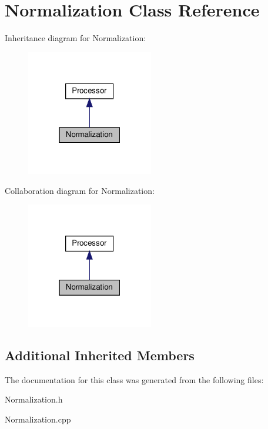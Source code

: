 \hypertarget{classNormalization}{}\section{Normalization Class Reference}
\label{classNormalization}


Inheritance diagram for Normalization\+:
\nopagebreak
\begin{figure}[H]
\begin{center}
\leavevmode
\includegraphics[width=157pt]{d2/d5e/classNormalization__inherit__graph}
\end{center}
\end{figure}


Collaboration diagram for Normalization\+:
\nopagebreak
\begin{figure}[H]
\begin{center}
\leavevmode
\includegraphics[width=157pt]{de/d74/classNormalization__coll__graph}
\end{center}
\end{figure}
\subsection*{Additional Inherited Members}


The documentation for this class was generated from the following files\+:\begin{DoxyCompactItemize}
\item 
Normalization.\+h\item 
Normalization.\+cpp\end{DoxyCompactItemize}

